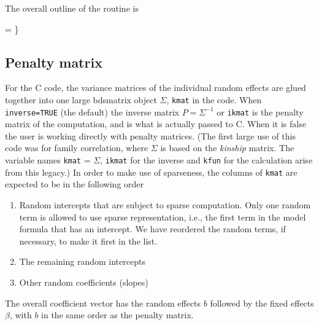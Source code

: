 \documentclass{article}
\begin{document}
The overall outline of the routine is
\begin{nwchunk}
=
 \}
\end{nwchunk}

\subsection{Penalty matrix}
For the C code, the variance matrices of the individual
random effects are glued together into one
large bdsmatrix object $\Sigma$, \Verb!kmat! in the code.
When \Verb!inverse=TRUE! (the default)
the inverse matrix $P = \Sigma^{-1}$ or 
\Verb!ikmat! is the penalty matrix of the computation, and
is what is actually passed to C.
When it is false the user is working directly with penalty matrices.
(The first large use of this code was for family correlation, where
$\Sigma$ is based on the \emph{kinship} matrix.  The variable names
\Verb!kmat! = $\Sigma$, \Verb?ikmat? for the inverse and \Verb+kfun+ for
the calculation arise from this legacy.)
In order to make use of sparseness, 
the columns of \Verb!kmat! are expected to be in the following order
\begin{enumerate}
\item Random intercepts that are subject to sparse computation.
Only one random term is allowed to use sparse representation, i.e., the
first term in the model formula that has an intercept.
We have reordered the random terms, if necessary, to make it first in the list.
\item The remaining random intercepts
\item Other random coefficients (slopes)
\end{enumerate}
The overall coefficient vector has the random effects $b$ followed
by the fixed effects $\beta$,
with $b$ in the same order as the penalty matrix.
\end{document}
